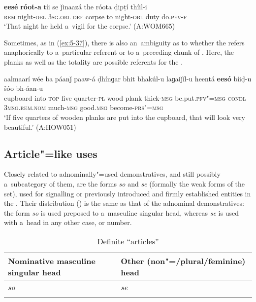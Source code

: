\begin{exe}
\ex
\label{ex:5-36}
\gll \textbf{eesé} \textbf{róot-a} tíi se ǰinaazá the róota ḍipṭí thíil-i\\
\textsc{rem} night-\textsc{obl} \textsc{3sg.obl} \textsc{def} corpse to night-\textsc{obl} duty do.\textsc{pfv-f}\\
\glt `That night he held a~vigil for the corpse.' (A:WOM665)
\end{exe}

Sometimes, as in (\ref{ex:5-37}), there is also an~ambiguity as to whether the  refers anaphorically to a~particular  referent or to a~preceding chunk of . Here, the planks as well as the totality are possible referents for the .

\ea
\label{ex:5-37}
\gll aalmaarí wée ba páanǰ paaw-á ḍhínɡar bhit bhakúl-u laɡaiǰíl-u heentá \textbf{eesó} bíiḍ-u šóo bh-áan-u \\
cupboard into \textsc{top} five quarter-\textsc{pl} wood plank thick-\textsc{msg} be.put.\textsc{pfv"=msg} \textsc{condl} \textsc{3msg.rem.nom} much-\textsc{msg} good.\textsc{msg} become-\textsc{prs"=msg}\\
\glt `If five quarters of wooden planks are put into the cupboard, that will look very beautiful.'
(A:HOW051)
\z



\subsection{Article"=like uses}
\label{subsec:5-2-6}

Closely related to adnominally"=used demonstratives, and still possibly a~subcategory of them, are the forms \textit{so} and \textit{se} (formally the weak forms of the  set), used for signalling  or previously introduced and firmly established entities in the . Their distribution () is the same as that of the adnominal demonstratives: the form \textit{so} is used preposed to a~masculine singular  head, whereas \textit{se} is used with a~head in any other case,  or number. 


\begin{table}[ht]
 \caption{Definite ``articles''}
\begin{tabularx}{\textwidth}{ Q Q }
\lsptoprule
Nominative masculine singular head &
Other (non"=/plural/feminine) head\\\midrule
\textit{so} &
\textit{se} \\\lspbottomrule
\end{tabularx}
\label{tab:5-5}
\end{table}

